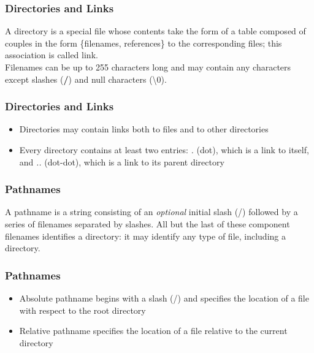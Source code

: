 \documentclass{beamer}
\begin{document}
\begin{frame}
\frametitle{Directories and Links}
\begin{definition}
A \alert{directory} is a special file whose contents take the form of a table composed of couples in the form \{filenames, references\} to the corresponding files; this association is called \alert{link}.
\\
Filenames can be up to 255 characters long and may contain any characters except slashes (\textbf{/}) and null characters (\textbackslash0).
\end{definition}
\end{frame}

\begin{frame}
\frametitle{Directories and Links}
\begin{itemize}
\item Directories may contain links both to files and to other directories
\item Every directory contains at least two entries: \emph{.} (dot), which is a link to itself, and \emph{..} (dot-dot), which is a link to its parent directory
\end{itemize}
\end{frame}

\begin{frame}
\frametitle{Pathnames}
\begin{definition}
A \alert{pathname} is a string consisting of an \emph{optional} initial slash (/) followed by a series of filenames separated by slashes. All but the last of these component filenames identifies a directory: it may identify any type of file, including a directory.
\end{definition}
\end{frame}

\begin{frame}
\frametitle{Pathnames}
\begin{itemize}
\item \alert{Absolute pathname} begins with a slash (/) and specifies the location of a file with respect to the root directory
\item \alert{Relative pathname} specifies the location of a file relative to the current directory 
\end{itemize}
\end{frame}
\end{document}
